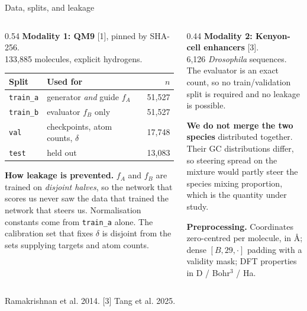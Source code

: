 \documentclass[aspectratio=169,10pt]{beamer}
\newcommand{\theslidelabel}{}
\newcommand{\lbl}[1]{\renewcommand{\theslidelabel}{#1}}
\newcommand{\srcs}[1]{\vfill{\raggedleft\color{grayt}\fontsize{4.9}{5.6}\selectfont #1\par}}
\begin{document}
\lbl{1b}
\begin{frame}{Data, splits, and leakage}
  \begin{columns}[T]
  \begin{column}{0.54\textwidth}
    \textbf{Modality 1: QM9} [1], pinned by SHA-256.\\
    133{,}885 molecules, explicit hydrogens.
    \smallskip

    {\small
    \begin{tabular}{llr}
      \toprule
      Split & Used for & $n$ \\
      \midrule
      \texttt{train\_a} & generator \emph{and} guide $f_A$ & 51{,}527 \\
      \texttt{train\_b} & evaluator $f_B$ only & 51{,}527 \\
      \texttt{val} & checkpoints, atom counts, $\delta$ & 17{,}748 \\
      \texttt{test} & held out & 13{,}083 \\
      \bottomrule
    \end{tabular}}
    \smallskip

    \textbf{How leakage is prevented.} $f_A$ and $f_B$ are trained on
    \emph{disjoint halves}, so the network that scores us never saw the data that
    trained the network that steers us. Normalisation constants come from
    \texttt{train\_a} alone. The calibration set that fixes $\delta$ is disjoint from
    the sets supplying targets and atom counts.
  \end{column}
  \begin{column}{0.44\textwidth}
    \textbf{Modality 2: Kenyon-cell enhancers} [3].\\
    6{,}126 \emph{Drosophila} sequences. The evaluator is an exact count, so no
    train/validation split is required and no leakage is possible.
    \smallskip

    \textbf{We do not merge the two species} distributed together. Their GC
    distributions differ, so steering spread on the mixture would partly steer the
    species mixing proportion, which is the quantity under study.
    \smallskip

    \textbf{Preprocessing.} Coordinates zero-centred per molecule, in \AA;
    dense $[B,29,\cdot]$ padding with a validity mask; DFT properties in
    D / Bohr$^3$ / Ha.
  \end{column}
  \end{columns}

  \srcs{[1] Ramakrishnan et al. 2014. [3] Tang et al. 2025.}
\end{frame}
\end{document}
